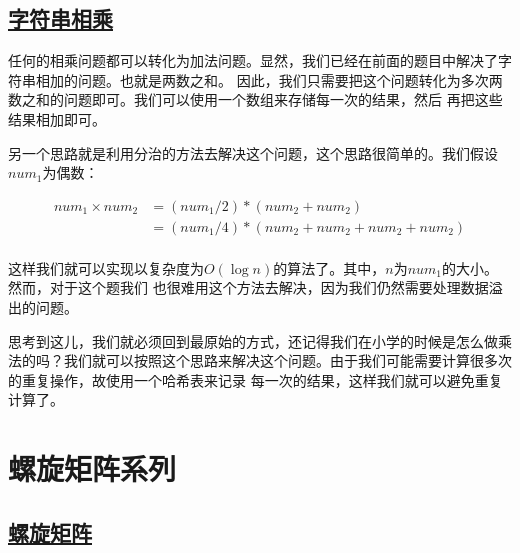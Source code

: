 \documentclass[../../main.tex]{subfiles}
\begin{document}
\subsection{\href{https://leetcode-cn.com/problems/multiply-strings/}{字符串相乘}}

任何的相乘问题都可以转化为加法问题。显然，我们已经在前面的题目中解决了字符串相加的问题。也就是两数之和。
因此，我们只需要把这个问题转化为多次两数之和的问题即可。我们可以使用一个数组来存储每一次的结果，然后
再把这些结果相加即可。

另一个思路就是利用分治的方法去解决这个问题，这个思路很简单的。我们假设$num_{1}$为偶数：

\begin{align*}
  num_{1} \times num_{2} &= (num_{1} / 2 ) * (num_{2} + num_{2}) \\
                         &= (num_{1} / 4) * (num_{2} + num_{2} + num_{2} + num_{2}) \\
\end{align*}

这样我们就可以实现以复杂度为$O(\log n)$的算法了。其中，$n$为$num_{1}$的大小。然而，对于这个题我们
也很难用这个方法去解决，因为我们仍然需要处理数据溢出的问题。

思考到这儿，我们就必须回到最原始的方式，还记得我们在小学的时候是怎么做乘法的吗？我们就可以按照这个思路来解决这个问题。由于我们可能需要计算很多次的重复操作，故使用一个哈希表来记录
每一次的结果，这样我们就可以避免重复计算了。



\section{螺旋矩阵系列}

\subsection{\href{https://leetcode.cn/problems/spiral-matrix/}{螺旋矩阵}}
\end{document}
